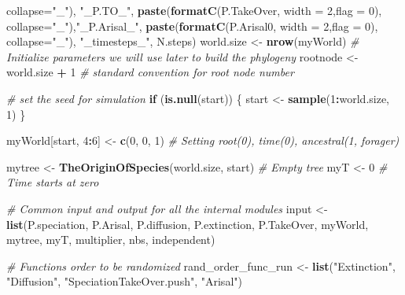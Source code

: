 \documentclass[]{book}
\newenvironment{Shaded}{\begin{snugshade}}{\end{snugshade}}
\newcommand{\KeywordTok}[1]{\textcolor[rgb]{0.13,0.29,0.53}{\textbf{{#1}}}}
\newcommand{\DataTypeTok}[1]{\textcolor[rgb]{0.13,0.29,0.53}{{#1}}}
\newcommand{\DecValTok}[1]{\textcolor[rgb]{0.00,0.00,0.81}{{#1}}}
\newcommand{\StringTok}[1]{\textcolor[rgb]{0.31,0.60,0.02}{{#1}}}
\newcommand{\CommentTok}[1]{\textcolor[rgb]{0.56,0.35,0.01}{\textit{{#1}}}}
\newcommand{\ControlFlowTok}[1]{\textcolor[rgb]{0.13,0.29,0.53}{\textbf{{#1}}}}
\newcommand{\OperatorTok}[1]{\textcolor[rgb]{0.81,0.36,0.00}{\textbf{{#1}}}}
\newcommand{\NormalTok}[1]{{#1}}
\theoremstyle{definition}
\theoremstyle{definition}
\theoremstyle{remark}
\begin{document}
\begin{Shaded}
\begin{Highlighting}[]
                         \DataTypeTok{collapse=}\StringTok{"_"}\NormalTok{), }\StringTok{"_P.TO_"}\NormalTok{,}
                   \KeywordTok{paste}\NormalTok{(}\KeywordTok{formatC}\NormalTok{(P.TakeOver, }\DataTypeTok{width =} \DecValTok{2}\NormalTok{,}\DataTypeTok{flag =} \DecValTok{0}\NormalTok{),}
                         \DataTypeTok{collapse=}\StringTok{"_"}\NormalTok{),}\StringTok{"_P.Arisal_"}\NormalTok{,}
                   \KeywordTok{paste}\NormalTok{(}\KeywordTok{formatC}\NormalTok{(P.Arisal0, }\DataTypeTok{width =} \DecValTok{2}\NormalTok{,}\DataTypeTok{flag =} \DecValTok{0}\NormalTok{),}
                         \DataTypeTok{collapse=}\StringTok{"_"}\NormalTok{), }\StringTok{"_timesteps_"}\NormalTok{,}
\NormalTok{                   N.steps)}
\NormalTok{  world.size <-}\StringTok{ }\KeywordTok{nrow}\NormalTok{(myWorld)}
  \CommentTok{# Initialize parameters we will use later to build the phylogeny}
\NormalTok{  rootnode <-}\StringTok{  }\NormalTok{world.size }\OperatorTok{+}\StringTok{ }\DecValTok{1} \CommentTok{# standard convention for root node number}

  \CommentTok{# set the seed for simulation}
  \ControlFlowTok{if}\NormalTok{ (}\KeywordTok{is.null}\NormalTok{(start)) \{}
\NormalTok{    start <-}\StringTok{ }\KeywordTok{sample}\NormalTok{(}\DecValTok{1}\OperatorTok{:}\NormalTok{world.size, }\DecValTok{1}\NormalTok{)}
\NormalTok{  \}}

\NormalTok{  myWorld[start, }\DecValTok{4}\OperatorTok{:}\DecValTok{6}\NormalTok{] <-}\StringTok{ }\KeywordTok{c}\NormalTok{(}\DecValTok{0}\NormalTok{, }\DecValTok{0}\NormalTok{, }\DecValTok{1}\NormalTok{) }\CommentTok{# Setting root(0), time(0), ancestral(1, forager)}

\NormalTok{  mytree <-}\StringTok{ }\KeywordTok{TheOriginOfSpecies}\NormalTok{(world.size, start) }\CommentTok{# Empty tree}
\NormalTok{  myT <-}\StringTok{ }\DecValTok{0} \CommentTok{# Time starts at zero}

  \CommentTok{# Common input and output for all the internal modules}
\NormalTok{  input <-}\StringTok{ }\KeywordTok{list}\NormalTok{(P.speciation, P.Arisal, P.diffusion, P.extinction, P.TakeOver,}
\NormalTok{                myWorld, mytree, myT, multiplier, nbs, independent)}

  \CommentTok{# Functions order to be randomized}
\NormalTok{  rand_order_func_run <-}\StringTok{ }\KeywordTok{list}\NormalTok{(}\StringTok{"Extinction"}\NormalTok{, }\StringTok{"Diffusion"}\NormalTok{,}
                              \StringTok{"SpeciationTakeOver.push"}\NormalTok{, }\StringTok{"Arisal"}\NormalTok{)}


\end{Highlighting}
\end{Shaded}
\end{document}
